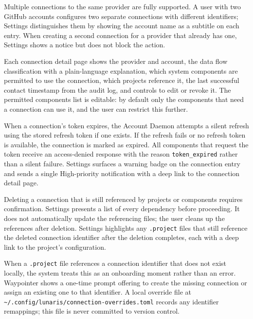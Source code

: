 Multiple connections to the same provider are fully supported. A user with two
GitHub accounts configures two separate connections with different identifiers;
Settings distinguishes them by showing the account name as a subtitle on each
entry. When creating a second connection for a provider that already has one,
Settings shows a notice but does not block the action.

Each connection detail page shows the provider and account, the data flow
classification with a plain-language explanation, which system components are
permitted to use the connection, which projects reference it, the last
successful contact timestamp from the audit log, and controls to edit or
revoke it. The permitted components list is editable: by default only the
components that need a connection can use it, and the user can restrict this
further.

When a connection's token expires, the Account Daemon attempts a silent
refresh using the stored refresh token if one exists. If the refresh fails or
no refresh token is available, the connection is marked as expired. All
components that request the token receive an access-denied response with the
reason \texttt{token\_expired} rather than a silent failure. Settings
surfaces a warning badge on the connection entry and sends a single
High-priority notification with a deep link to the connection detail page.

Deleting a connection that is still referenced by projects or components
requires confirmation. Settings presents a list of every dependency before
proceeding. It does not automatically update the referencing files; the user
cleans up the references after deletion. Settings highlights any
\texttt{.project} files that still reference the deleted connection identifier
after the deletion completes, each with a deep link to the project's
configuration.

When a \texttt{.project} file references a connection identifier that does not
exist locally, the system treats this as an onboarding moment rather than an
error. Waypointer shows a one-time prompt offering to create the missing
connection or assign an existing one to that identifier. A local override file
at \texttt{\textasciitilde/.config/lunaris/connection-overrides.toml} records
any identifier remappings; this file is never committed to version control.

